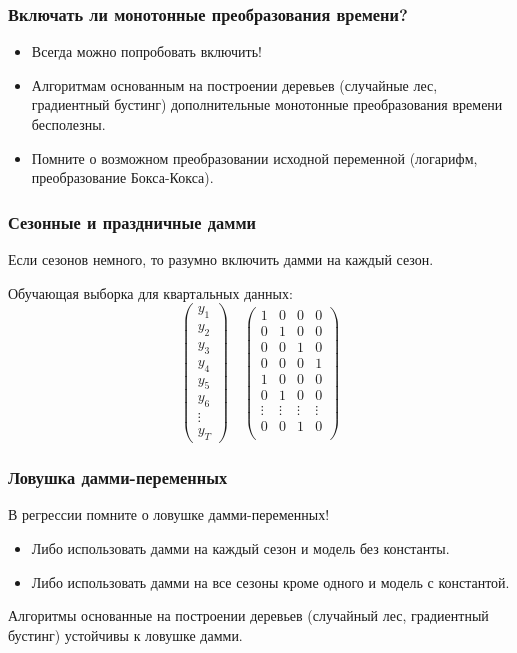 \begin{frame}
  \frametitle{Включать ли монотонные преобразования времени?}

  \begin{itemize}[<+->]
    \item Всегда \alert{можно попробовать} включить!
    \item Алгоритмам основанным на построении \alert{деревьев} (случайные лес, градиентный бустинг)
    дополнительные монотонные преобразования времени \alert{бесполезны}. 
    \item Помните о возможном преобразовании \alert{исходной переменной} (логарифм, преобразование Бокса-Кокса).
  \end{itemize}
\end{frame}

\begin{frame}
  \frametitle{Сезонные и праздничные дамми}

  Если сезонов \alert{немного}, то разумно включить дамми на каждый сезон.

  \pause
  \alert{Обучающая} выборка для квартальных данных:
  \[
  \begin{pmatrix}
    y_1 \\
    y_2 \\
    y_3 \\
    y_4 \\
    y_5 \\
    y_6 \\
    \vdots \\
    y_T 
  \end{pmatrix}  \quad 
  \begin{pmatrix}
    1 & 0 & 0 & 0 \\
    0 & 1 & 0 & 0 \\
    0 & 0 & 1 & 0 \\
    0 & 0 & 0 & 1 \\
    1 & 0 & 0 & 0 \\
    0 & 1 & 0 & 0 \\
    \vdots & \vdots &  \vdots & \vdots \\
    0 & 0 & 1 & 0 \\
  \end{pmatrix}
  \]
\end{frame}


\begin{frame}
  \frametitle{Ловушка дамми-переменных}

  
  В \alert{регрессии} помните о \alert{ловушке} дамми-переменных! \pause 
  
  \begin{itemize}[<+->]
    \item Либо использовать дамми на каждый сезон и модель без константы.
    \item Либо использовать дамми на все сезоны кроме одного и модель с константой. 
  \end{itemize}
  
  \pause 
  Алгоритмы основанные на построении \alert{деревьев} (случайный лес, градиентный бустинг)
 \alert{устойчивы} к ловушке дамми. 
\end{frame}


